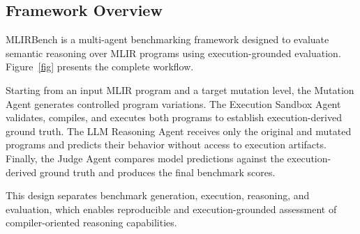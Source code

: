 \documentclass[sigplan,screen,review,anonymous]{acmart}
\providecommand{\DIFdelbegin}{} %
\begin{document}
\subsection{Framework Overview}

MLIRBench is a multi-agent benchmarking framework designed to evaluate semantic reasoning over MLIR programs using execution-grounded evaluation. Figure~\ref{fig} presents the complete workflow.

Starting from an input MLIR program and a target mutation level, the Mutation Agent generates controlled program variations. The Execution Sandbox Agent validates, compiles, and executes both programs to establish execution-derived ground truth. The LLM Reasoning Agent receives only the original and mutated programs and predicts their behavior without access to execution artifacts. Finally, the Judge Agent compares model predictions against the execution-derived ground truth and produces the final benchmark scores.

This design separates benchmark generation, execution, reasoning, and evaluation, which enables reproducible and execution-grounded assessment of compiler-oriented reasoning capabilities.

\DIFdelbegin %


\end{document}
